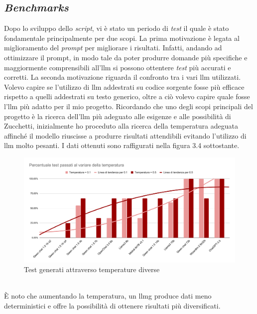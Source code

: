     \subsection{\textit{Benchmarks}}
    Dopo lo sviluppo dello \textit{script}, vi è stato un periodo di \textit{test} il quale è stato fondamentale principalmente per due scopi. 
    La prima motivazione è legata al miglioramento del \textit{prompt} per migliorare i risultati.
    Infatti, andando ad ottimizzare il prompt, in modo tale da poter produrre domande più specifiche e maggiormente comprensibili all'\gls{llm}  si possono ottentere \textit{test} più accurati 
    e corretti. 
    La seconda motivazione riguarda il confronto tra i vari \gls{llm} utilizzati.
    Volevo capire se l'utilizzo di \gls{llm} addestrati su codice sorgente fosse più efficace rispetto a quelli addestrati su testo generico, oltre a ciò volevo capire quale fosse l'\gls{llm} più adatto per il mio progetto.
    Ricordando che uno degli scopi principali del progetto è la ricerca dell’\gls{llm} più adeguato alle esigenze e alle possibilità di Zucchetti, 
    inizialmente ho proceduto alla ricerca della temperatura adeguata affinché il modello riuscisse a produrre risultati attendibili evitando 
    l’utilizzo di \gls{llm} molto pesanti. I dati ottenuti sono raffigurati nella figura 3.4 sottostante.\newpage
    \begin{figure}[!h]
        \centering        
        \includegraphics[width=14.5cm]{img/Percentuale test passati al variare della temperatura.pdf}
        \caption{Test generati attraverso temperature diverse}
    \end{figure}
    \\È noto che aumentando la temperatura, un \gls{llmg} produce dati meno deterministici e offre la possibilità di ottenere risultati più diversificati.
